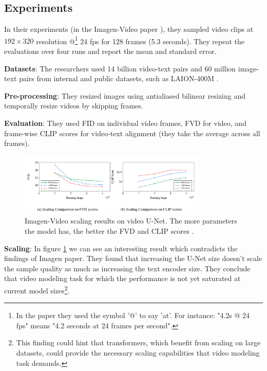 \subsection{Experiments}

In their experiments (in the Imagen-Video paper \cite{imagen_video}), they sampled video clips at $192\times 320$ resolution @\footnote{In the paper they used the symbol '@' to say 'at'. For instance: "4.2s @ 24 fps" means "4.2 seconds at 24 frames per second".} 24 fps for 128 frames (5.3 seconds). They repeat the evaluations over four runs and report the mean and standard error.

\textbf{Datasets}: The researchers used 14 billion video-text pairs and 60 million image-text pairs from internal and public datasets, such as LAION-400M \cite{laion_400m}.

\textbf{Pre-processing}: They resized images using antialiased bilinear resizing and temporally resize videos by skipping frames.

\textbf{Evaluation}: They used FID on individual video frames, FVD for video, and frame-wise CLIP scores for video-text alignment (they take the average across all frames).

\begin{figure}
    \centering
    \includegraphics[width=0.8\textwidth]{images/imagen_video/scaling.png}
    \caption{Imagen-Video scaling results on video U-Net. The more parameters the model has, the better the FVD and CLIP scores \cite{imagen_video}.}
    \label{fig:imagen_video_scaling}
\end{figure}

\textbf{Scaling}: In figure \ref{fig:imagen_video_scaling} we can see an interesting result which contradicts the findings of Imagen \cite{imagen} paper. They found that increasing the U-Net size doesn't scale the sample quality as much as increasing the text encoder size. They conclude that video modeling task for which the performance is not yet saturated at current model sizes\footnote{This finding could hint that transformers, which benefit from scaling on large datasets, could provide the necessary scaling capabilities that video modeling task demands.}.

